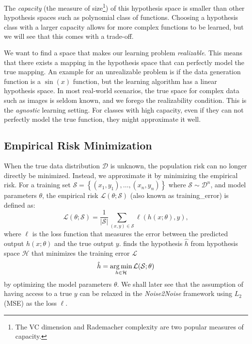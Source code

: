 The \textit{capacity} (the measure of size\footnote{The VC dimension and Rademacher complexity are two popular measures of capacity.}) of this hypothesis space is smaller than other hypothesis spaces such as polynomial class of functions. Choosing a hypothesis class with a larger capacity allows for more complex functions to be learned, but we will see that this comes with a trade-off.

We want to find a space that makes our learning problem \textit{realizable}. This means that there exists a mapping in the hypothesis space that can perfectly model the true mapping. An example for an unrealizable problem is if the data generation function is a $\sin(x)$ function, but the learning algorithm has a linear hypothesis space. In most real-world scenarios, the true space for complex data such as images is seldom known, and we forego the realizability condition. This is the \textit{agnostic} learning setting. For classes with high capacity, even if they can not perfectly model the true function, they might approximate it well.

\subsection{Empirical Risk Minimization}\label{sec:erm}
When the true data distribution $\mathcal{D}$ is unknown, the population risk can no longer directly be minimized. Instead, we approximate it by minimizing the empirical risk. For a training set $\mathcal{S} = \left\{ (x_1, y_1), \ldots, (x_n, y_n) \right\}$ where $\mathcal{S} \sim \mathcal{D}^n$, and model parameters $\theta$, the empirical risk $\mathcal{L}(\theta; \mathcal{S})$ (also known as \gls{training_error}) is defined as:
\begin{equation}
    \mathcal{L}(\theta; \mathcal{S}) = \frac{1}{\lvert \mathcal{S} \rvert} \sum_{(x, y) \in \mathcal{S}} \ell(h(x; \theta), y),
\end{equation}
where $\ell$ is the loss function that measures the error between the predicted output $h(x; \theta)$ and the true output $y$.  finds the hypothesis $\hat{h}$ from hypothesis space $\mathcal{H}$ that minimizes the training error $\mathcal{L}$
\begin{equation}\label{eq:erm}
    \hat{h} = \operatorname*{arg\,min}_{h \in \mathcal{H}} \mathcal{L}(\mathcal{S};\theta)
\end{equation}
by optimizing the model parameters $\theta$.
We shall later see that the assumption of having access to a true $y$ can be relaxed in the \textit{Noise2Noise} framework using $L_2$ (\gls{MSE}) as the loss $\ell$.

